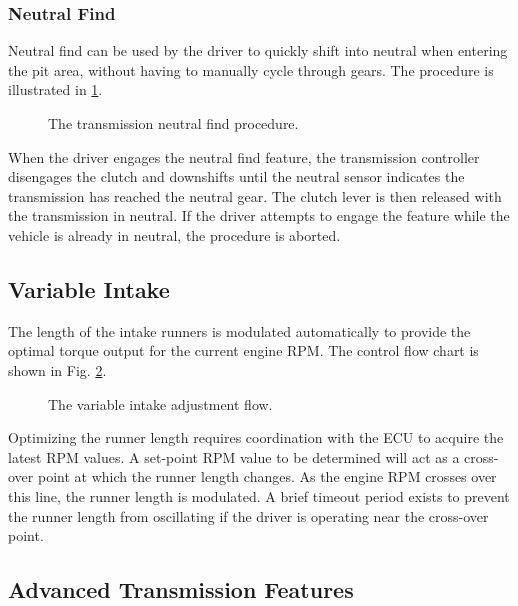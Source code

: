 
\subsubsection{Neutral Find}

Neutral find can be used by the driver to quickly shift into neutral when entering the pit area, without having to manually cycle through gears. The procedure is illustrated in \ref{fig:transmission_neutralfind_flow}.

\begin{figure}[H]
	\centering
	
	\caption{The transmission neutral find procedure.}
	\label{fig:transmission_neutralfind_flow}
\end{figure}

When the driver engages the neutral find feature, the transmission controller disengages the clutch and downshifts until the neutral sensor indicates the transmission has reached the neutral gear. The clutch lever is then released with the transmission in neutral. If the driver attempts to engage the feature while the vehicle is already in neutral, the procedure is aborted.

\subsection{Variable Intake}

The length of the intake runners is modulated automatically to provide the optimal torque output for the current engine RPM. The control flow chart is shown in Fig. \ref{fig:engine_varintake_flow}. 
\begin{figure}[H]
	\centering
	
	\caption{The variable intake adjustment flow.}
	\label{fig:engine_varintake_flow}
\end{figure}

Optimizing the runner length requires coordination with the ECU to acquire the latest RPM values. A set-point RPM value to be determined will act as a cross-over point at which the runner length changes. As the engine RPM crosses over this line, the runner length is modulated. A brief timeout period exists to prevent the runner length from oscillating if the driver is operating near the cross-over point.

\subsection{Advanced Transmission Features}

